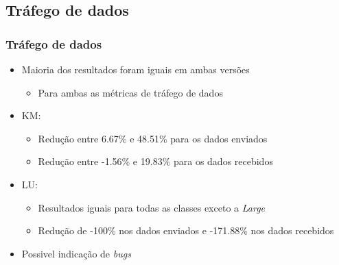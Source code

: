 \documentclass[xcolor={table}]{beamer}
\begin{document}
\subsection{Tráfego de dados}
\begin{frame}\frametitle{Tráfego de dados}
    \begin{itemize}
        \item {Maioria dos resultados foram iguais em ambas versões}
        \begin{itemize}
            \item {Para ambas as métricas de tráfego de dados}
        \end{itemize}
        \item {KM:}
        \begin{itemize}
            \item {Redução entre 6.67\% e 48.51\% para os dados enviados}
            \item {Redução entre -1.56\% e 19.83\% para os dados recebidos}
        \end{itemize}
        \item {LU:}
        \begin{itemize}
            \item {Resultados iguais para todas as classes exceto a \textit{Large}}
            \item {Redução de -100\% nos dados enviados e -171.88\% nos dados recebidos}
        \end{itemize}
        \item {Possivel indicação de \textit{bugs}}
    \end{itemize}
\end{frame}
\end{document}
